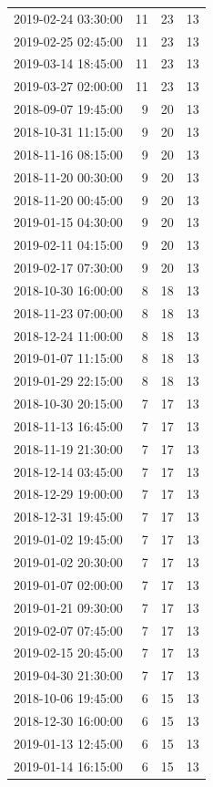 \begin{tabular}{lrrr}
2019-02-24 03:30:00 & 11 & 23 & 13 \\
2019-02-25 02:45:00 & 11 & 23 & 13 \\
2019-03-14 18:45:00 & 11 & 23 & 13 \\
2019-03-27 02:00:00 & 11 & 23 & 13 \\
2018-09-07 19:45:00 & 9 & 20 & 13 \\
2018-10-31 11:15:00 & 9 & 20 & 13 \\
2018-11-16 08:15:00 & 9 & 20 & 13 \\
2018-11-20 00:30:00 & 9 & 20 & 13 \\
2018-11-20 00:45:00 & 9 & 20 & 13 \\
2019-01-15 04:30:00 & 9 & 20 & 13 \\
2019-02-11 04:15:00 & 9 & 20 & 13 \\
2019-02-17 07:30:00 & 9 & 20 & 13 \\
2018-10-30 16:00:00 & 8 & 18 & 13 \\
2018-11-23 07:00:00 & 8 & 18 & 13 \\
2018-12-24 11:00:00 & 8 & 18 & 13 \\
2019-01-07 11:15:00 & 8 & 18 & 13 \\
2019-01-29 22:15:00 & 8 & 18 & 13 \\
2018-10-30 20:15:00 & 7 & 17 & 13 \\
2018-11-13 16:45:00 & 7 & 17 & 13 \\
2018-11-19 21:30:00 & 7 & 17 & 13 \\
2018-12-14 03:45:00 & 7 & 17 & 13 \\
2018-12-29 19:00:00 & 7 & 17 & 13 \\
2018-12-31 19:45:00 & 7 & 17 & 13 \\
2019-01-02 19:45:00 & 7 & 17 & 13 \\
2019-01-02 20:30:00 & 7 & 17 & 13 \\
2019-01-07 02:00:00 & 7 & 17 & 13 \\
2019-01-21 09:30:00 & 7 & 17 & 13 \\
2019-02-07 07:45:00 & 7 & 17 & 13 \\
2019-02-15 20:45:00 & 7 & 17 & 13 \\
2019-04-30 21:30:00 & 7 & 17 & 13 \\
2018-10-06 19:45:00 & 6 & 15 & 13 \\
2018-12-30 16:00:00 & 6 & 15 & 13 \\
2019-01-13 12:45:00 & 6 & 15 & 13 \\
2019-01-14 16:15:00 & 6 & 15 & 13 \\

\end{tabular}
